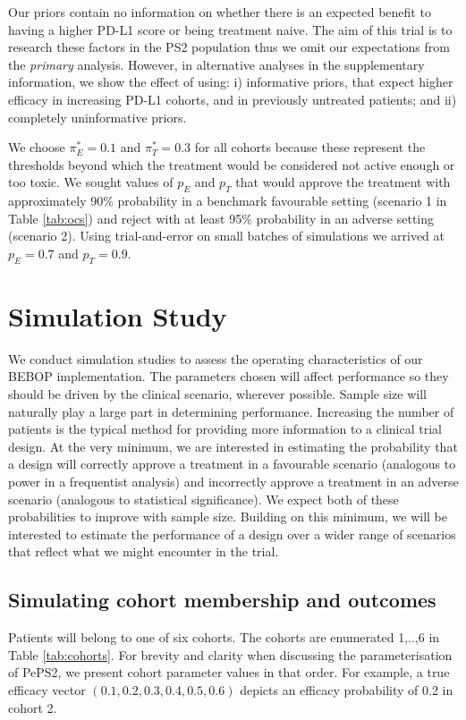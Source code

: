 \documentclass[alpha-refs]{wiley-article}
\begin{document}
Our priors contain no information on whether there is an expected benefit to having a higher PD-L1 score or being treatment naive. 
The aim of this trial is to research these factors in the PS2 population thus we omit our expectations from the \textit{primary} analysis.
However, in alternative analyses in the supplementary information, we show the effect of using: i) informative priors, that expect higher efficacy in increasing PD-L1 cohorts, and in previously untreated patients; and ii) completely uninformative priors.

We choose $\pi_E^* = 0.1$ and $\pi_T^* = 0.3$ for all cohorts because these represent the thresholds beyond which the treatment would be considered not active enough or too toxic.
We sought values of $p_E$ and $p_T$ that would approve the treatment with approximately 90\% probability in a benchmark favourable setting (scenario 1 in Table \ref{tab:ocs}) and reject with at least 95\% probability in an adverse setting (scenario 2).
Using trial-and-error on small batches of simulations we arrived at $p_E = 0.7$ and $p_T = 0.9$.




\section{Simulation Study}
\label{s:simulations}
We conduct simulation studies to assess the operating characteristics of our BEBOP implementation.
The parameters chosen will affect performance so they should be driven by the clinical scenario, wherever possible.
Sample size will naturally play a large part in determining performance.
Increasing the number of patients is the typical method for providing more information to a clinical trial design.
At the very minimum, we are interested in estimating the probability that a design will correctly approve a treatment in a favourable scenario (analogous to power in a frequentist analysis) and incorrectly approve a treatment in an adverse scenario (analogous to statistical significance).
We expect both of these probabilities to improve with sample size.
Building on this minimum, we will be interested to estimate the performance of a design over a wider range of scenarios that reflect what we might encounter in the trial.

\subsection{Simulating cohort membership and outcomes}
Patients will belong to one of six cohorts.
The cohorts are enumerated 1,..,6 in Table \ref{tab:cohorts}.
For brevity and clarity when discussing the parameterisation of PePS2, we present cohort parameter values in that order.
For example, a true efficacy vector $(0.1, 0.2, 0.3, 0.4, 0.5, 0.6)$ depicts an efficacy probability of 0.2 in cohort 2.
\end{document}
